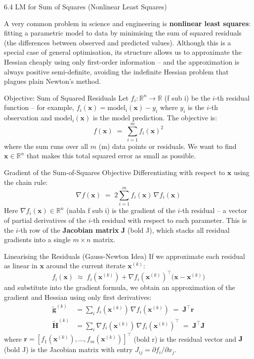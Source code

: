 \documentclass[aspectratio=169,10pt]{beamer}
\newcommand{\xbf}{\mathbf{x}}
\newcommand{\gbf}{\mathbf{g}}
\newcommand{\Hbf}{\mathbf{H}}
\begin{document}
\begin{frame}[allowframebreaks]{6.4 LM for Sum of Squares (Nonlinear Least Squares)}

  A very common problem in science and engineering is \textbf{nonlinear least
  squares}: fitting a parametric model to data by minimising the sum of squared
  residuals (the differences between observed and predicted values).  Although
  this is a special case of general optimisation, its structure allows us to
  approximate the Hessian cheaply using only first-order information -- and the
  approximation is always positive semi-definite, avoiding the indefinite Hessian
  problem that plagues plain Newton's method.

  \begin{block}{Objective: Sum of Squared Residuals}
    Let $f_i : \mathbb{R}^n \to \mathbb{R}$ (f sub i) be the $i$-th residual
    function -- for example, $f_i(\xbf) = \text{model}_i(\xbf) - y_i$ where
    $y_i$ is the $i$-th observation and $\text{model}_i(\xbf)$ is the model
    prediction.  The objective is:
    \[
      f(\xbf) \;=\; \sum_{i=1}^{m} f_i(\xbf)^2
    \]
    where the sum runs over all $m$ (m) data points or residuals.  We want to find
    $\xbf \in \mathbb{R}^n$ that makes this total squared error as small as
    possible.
  \end{block}

  \begin{block}{Gradient of the Sum-of-Squares Objective}
    Differentiating with respect to $\xbf$ using the chain rule:
    \[
      \nabla f(\xbf) \;=\; 2\sum_{i=1}^{m} f_i(\xbf)\,\nabla f_i(\xbf)
    \]
    Here $\nabla f_i(\xbf) \in \mathbb{R}^n$ (nabla f sub i) is the gradient of
    the $i$-th residual -- a vector of partial derivatives of the $i$-th residual
    with respect to each parameter.  This is the $i$-th row of the
    \textbf{Jacobian matrix} $\mathbf{J}$ (bold J), which stacks all residual
    gradients into a single $m \times n$ matrix.
  \end{block}

  \begin{block}{Linearising the Residuals (Gauss-Newton Idea)}
    If we approximate each residual as linear in $\xbf$ around the current
    iterate $\xbf^{(k)}$:
    \[
      f_i(\xbf) \;\approx\; f_i\!\left(\xbf^{(k)}\right)
        + \nabla f_i\!\left(\xbf^{(k)}\right)^\top\!\bigl(\xbf - \xbf^{(k)}\bigr)
    \]
    and substitute into the gradient formula, we obtain an approximation of the
    gradient and Hessian using only first derivatives:
    \begin{align*}
      \tilde{\gbf}^{(k)} &= \sum_i f_i(\xbf^{(k)})\,\nabla f_i(\xbf^{(k)})
                          \;=\; \mathbf{J}^\top \mathbf{r} \\[4pt]
      \tilde{\Hbf}^{(k)} &= \sum_i \nabla f_i(\xbf^{(k)})\,\nabla f_i(\xbf^{(k)})^\top
                          \;=\; \mathbf{J}^\top \mathbf{J}
    \end{align*}
    where $\mathbf{r} = [f_1(\xbf^{(k)}),\ldots,f_m(\xbf^{(k)})]^\top$ (bold r)
    is the residual vector and $\mathbf{J}$ (bold J) is the Jacobian matrix with
    entry $J_{ij} = \partial f_i / \partial x_j$.
  \end{block}


\end{frame}
\end{document}
